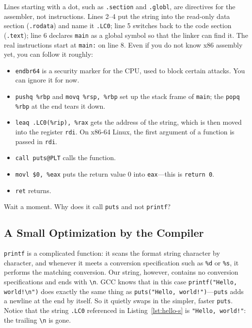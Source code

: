 Lines starting with a dot, such as \texttt{.section} and \texttt{.globl}, are directives for the assembler, not instructions. Lines 2--4 put the string into the read-only data section (\texttt{.rodata}) and name it \texttt{.LC0}; line 5 switches back to the code section (\texttt{.text}); line 6 declares \texttt{main} as a global symbol so that the linker can find it. The real instructions start at \texttt{main:} on line 8. Even if you do not know x86 assembly yet, you can follow it roughly:
\begin{itemize}
  \item \texttt{endbr64} is a security marker for the CPU, used to block certain attacks. You can ignore it for now.
  \item \texttt{pushq \%rbp} and \texttt{movq \%rsp, \%rbp} set up the stack frame of \texttt{main}; the \texttt{popq \%rbp} at the end tears it down.
  \item \texttt{leaq .LC0(\%rip), \%rax} gets the address of the string, which is then moved into the register \texttt{rdi}. On x86-64 Linux, the first argument of a function is passed in \texttt{rdi}.
  \item \texttt{call puts@PLT} calls the function.
  \item \texttt{movl \$0, \%eax} puts the return value 0 into \texttt{eax}---this is \texttt{return 0}.
  \item \texttt{ret} returns.
\end{itemize}

Wait a moment. Why does it call \texttt{puts} and not \texttt{printf}?

\subsection{A Small Optimization by the Compiler}

\texttt{printf} is a complicated function: it scans the format string character by character, and whenever it meets a conversion specification such as \texttt{\%d} or \texttt{\%s}, it performs the matching conversion. Our string, however, contains no conversion specifications and ends with \texttt{\textbackslash n}. GCC knows that in this case \texttt{printf("Hello, world!\textbackslash n")} does exactly the same thing as \texttt{puts("Hello, world!")}---\texttt{puts} adds a newline at the end by itself. So it quietly swaps in the simpler, faster \texttt{puts}. Notice that the string \texttt{.LC0} referenced in Listing~\ref{lst:hello-s} is \texttt{"Hello, world!"}: the trailing \texttt{\textbackslash n} is gone.


